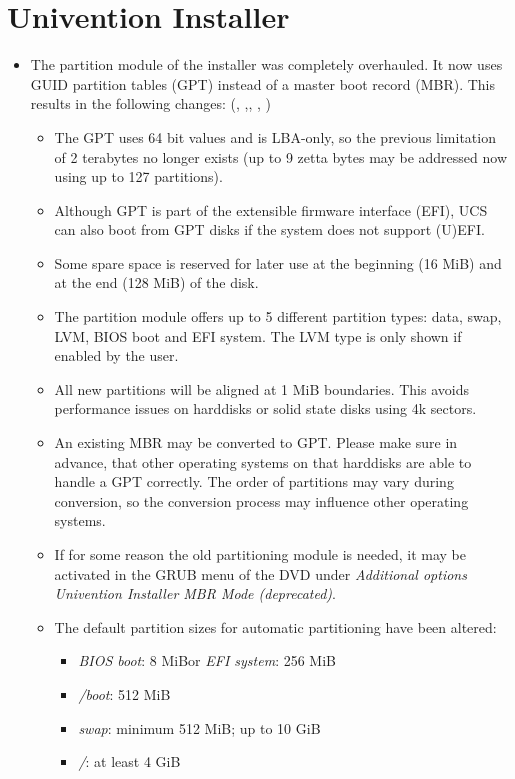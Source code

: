 \section{Univention Installer}
\begin{itemize}

\item The partition module of the installer was completely overhauled. It now uses GUID partition tables (GPT)
  instead of a master boot record (MBR). This results in the following changes: (, 
  ,, , )
  \begin{itemize}
  \item The GPT uses 64 bit values and is LBA-only, so the previous
    limitation of 2 terabytes no longer exists (up to 9 zetta bytes
    may be addressed now using up to 127 partitions).
  \item Although GPT is part of the extensible firmware interface
    (EFI), UCS can also boot from GPT disks if the system does not
    support (U)EFI.
  \item Some spare space is reserved for later use at the beginning
    (16 MiB) and at the end (128 MiB) of the disk.
  \item The partition module offers up to 5 different partition types:
    data, swap, LVM, BIOS boot and EFI system. The LVM type is only
    shown if enabled by the user.
  \item All new partitions will be aligned at 1 MiB boundaries. This
    avoids performance issues on harddisks or solid state disks using
    4k sectors.
  \item An existing MBR may be converted to GPT. Please make sure in advance, that other operating systems 
    on that harddisks are able to handle a GPT correctly. The order of partitions may vary 
    during conversion, so the conversion process may influence other operating systems.
  \item If for some reason the old partitioning module is needed, it
    may be activated in the GRUB menu of the DVD under
    \emph{Additional options} \ucsRightArrow \emph{Univention
      Installer MBR Mode (deprecated)}.
  \item The default partition sizes for automatic partitioning have been altered:
    \begin{itemize}
    \item \emph{BIOS boot}: 8 MiB\quad or \emph{EFI system}: 256 MiB
    \item \emph{/boot}: 512 MiB
    \item \emph{swap}: minimum 512 MiB; up to 10 GiB
    \item \emph{/}: at least 4 GiB
    \end{itemize}


\end{itemize}
\end{itemize}

